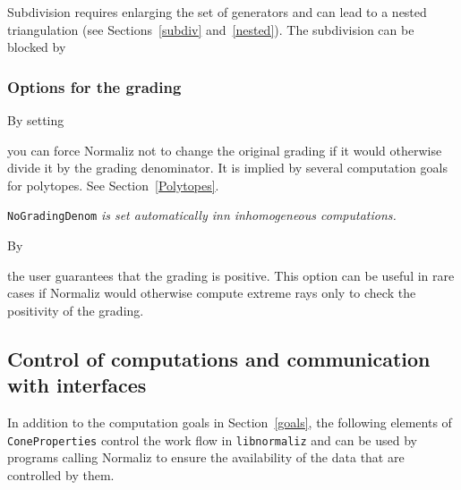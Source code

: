 Subdivision requires enlarging the set of generators and can lead to a nested triangulation (see Sections~\ref{subdiv} and~\ref{nested}). The subdivision can be blocked by
\begin{itemize}
	\itemtt[NoSubdivision]
\end{itemize}

\subsubsection{Options for the grading}

By setting
\begin{itemize}
	\itemtt[NoGradingDenom]
\end{itemize}
you can force Normaliz not to change the original grading if it would otherwise divide it by the grading denominator. It is implied by several computation goals for polytopes. See Section~\ref{Polytopes}.

\verb|NoGradingDenom| \emph{is set automatically inn inhomogeneous computations.}

By
\begin{itemize}
	\itemtt[GradingIsPositive]
\end{itemize}
the user guarantees that the grading is positive. This option can be useful in rare cases if Normaliz would otherwise compute extreme rays only to check the positivity of the grading.

\subsection{Control of computations and communication with interfaces}

In addition to the computation goals in Section~\ref{goals},
the following elements of \verb|ConeProperties| control the work flow in \verb|libnormaliz| and can be used by programs calling Normaliz to ensure the availability of the data that are controlled by them.

